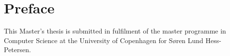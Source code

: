 \chapter*{Preface}
This Master's thesis is submitted in fulfilment of the master programme in Computer Science at the University of Copenhagen for Søren Lund Hess-Petersen.
